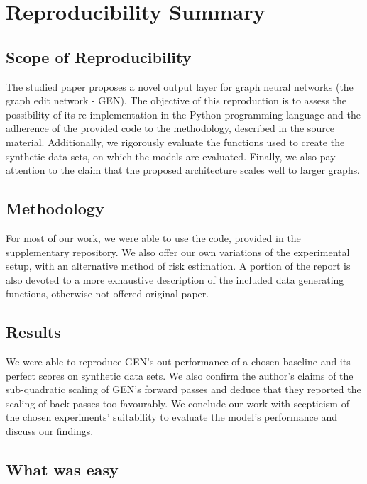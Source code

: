 \section*{Reproducibility Summary}

\subsection*{Scope of Reproducibility}

The studied paper proposes a novel output layer for graph neural networks (the graph edit network - GEN). The objective of this reproduction is to assess the possibility of its re-implementation in the Python programming language and the adherence of the provided code to the methodology, described in the source material. Additionally, we rigorously evaluate the functions used to create the synthetic data sets, on which the models are evaluated. Finally, we also pay attention to the claim that the proposed architecture scales well to larger graphs.  


\subsection*{Methodology}


For most of our work, we were able to use the code, provided in the supplementary repository. We also offer our own variations of the experimental setup, with an alternative method of risk estimation. A portion of the report is also devoted to a more exhaustive description of the included data generating functions, otherwise not offered original paper.

\subsection*{Results}

We were able to reproduce GEN's out-performance of a chosen baseline and its perfect scores on synthetic data sets. We also confirm the author's claims of the sub-quadratic scaling of GEN's forward passes and deduce that they reported the scaling of back-passes too favourably. We conclude our work with scepticism of the chosen experiments' suitability to evaluate the model's performance and discuss our findings.


\subsection*{What was easy}



